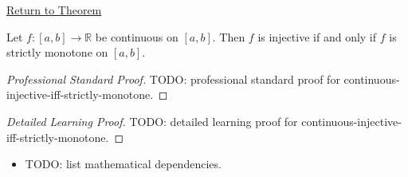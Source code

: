 \newpage
{}
\label{prf:continuous-injective-iff-strictly-monotone}

\begin{remark*}[Return]
\hyperref[prop:continuous-injective-iff-strictly-monotone]{Return to Theorem}
\end{remark*}

\begin{proposition*}
Let $f:[a,b]\to\mathbb{R}$ be continuous on $[a,b]$. Then $f$ is injective if and only if $f$ is strictly monotone on $[a,b]$.
\end{proposition*}

\begin{proof}[Professional Standard Proof]
\LRAProofBodyStart
TODO: professional standard proof for continuous-injective-iff-strictly-monotone.
\end{proof}

\begin{proof}[Detailed Learning Proof]
\LRAProofBodyStart
TODO: detailed learning proof for continuous-injective-iff-strictly-monotone.
\end{proof}

\begin{remark*}
\end{remark*}

\begin{dependencies}
\begin{itemize}
  \item TODO: list mathematical dependencies.
\end{itemize}
\end{dependencies}

\clearpage
